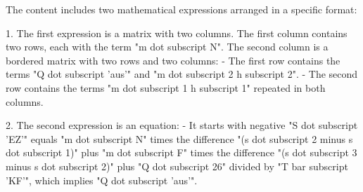 The content includes two mathematical expressions arranged in a specific format:

1. The first expression is a matrix with two columns. The first column contains two rows, each with the term "m dot subscript N". The second column is a bordered matrix with two rows and two columns:
   - The first row contains the terms "Q dot subscript 'aus'" and "m dot subscript 2 h subscript 2".
   - The second row contains the terms "m dot subscript 1 h subscript 1" repeated in both columns.

2. The second expression is an equation:
   - It starts with negative "S dot subscript 'EZ'" equals "m dot subscript N" times the difference "(s dot subscript 2 minus s dot subscript 1)" plus "m dot subscript F" times the difference "(s dot subscript 3 minus s dot subscript 2)" plus "Q dot subscript 26" divided by "T bar subscript 'KF'", which implies "Q dot subscript 'aus'".